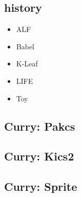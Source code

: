 
\subsection{history}
\begin{itemize}
  \item ALF
  \item Babel
  \item K-Leaf
  \item LIFE
  \item Toy
\end{itemize}
\subsection{Curry: Pakcs}
\subsection{Curry: Kics2}
\subsection{Curry: Sprite}

